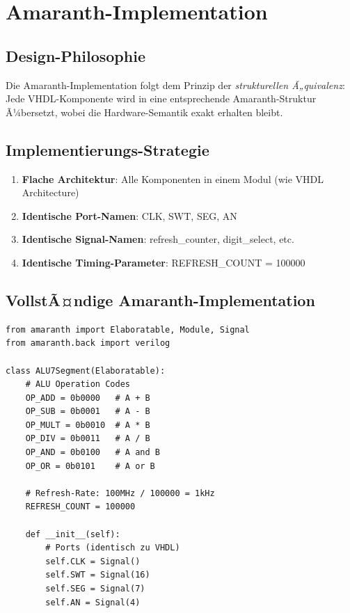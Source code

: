 ﻿\documentclass[12pt,a4paper]{report}
\begin{document}
\chapter{Amaranth-Implementation}

\section{Design-Philosophie}


Die Amaranth-Implementation folgt dem Prinzip der \textit{strukturellen Ã„quivalenz}: Jede VHDL-Komponente wird in eine entsprechende Amaranth-Struktur Ã¼bersetzt, wobei die Hardware-Semantik exakt erhalten bleibt.

\section{Implementierungs-Strategie}

\begin{enumerate}
    \item \textbf{Flache Architektur}: Alle Komponenten in einem Modul (wie VHDL Architecture)
    \item \textbf{Identische Port-Namen}: CLK, SWT, SEG, AN
    \item \textbf{Identische Signal-Namen}: refresh\_counter, digit\_select, etc.
    \item \textbf{Identische Timing-Parameter}: REFRESH\_COUNT = 100000
\end{enumerate}

\section{VollstÃ¤ndige Amaranth-Implementation}

\begin{lstlisting}[style=pythonstyle, caption={Amaranth ALU-Implementation - Teil 1}]
from amaranth import Elaboratable, Module, Signal
from amaranth.back import verilog

class ALU7Segment(Elaboratable):
    # ALU Operation Codes
    OP_ADD = 0b0000   # A + B
    OP_SUB = 0b0001   # A - B
    OP_MULT = 0b0010  # A * B
    OP_DIV = 0b0011   # A / B
    OP_AND = 0b0100   # A and B
    OP_OR = 0b0101    # A or B
    
    # Refresh-Rate: 100MHz / 100000 = 1kHz
    REFRESH_COUNT = 100000
    
    def __init__(self):
        # Ports (identisch zu VHDL)
        self.CLK = Signal()
        self.SWT = Signal(16)
        self.SEG = Signal(7)
        self.AN = Signal(4)
\end{lstlisting}
\end{document}
